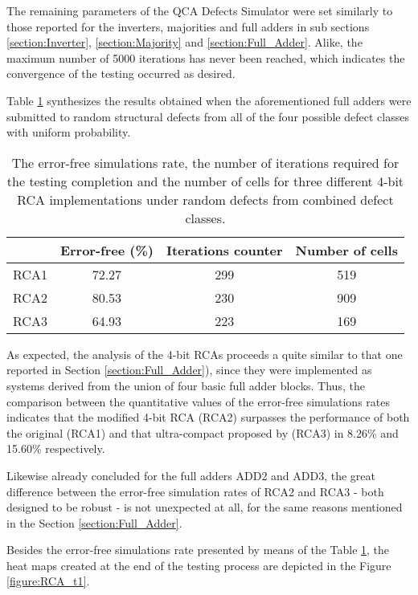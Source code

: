 The remaining parameters of the QCA Defects Simulator were set similarly to those reported for the inverters, majorities and full adders in sub sections \ref{section:Inverter}, \ref{section:Majority} and \ref{section:Full_Adder}. Alike, the maximum number of 5000 iterations has never been reached, which indicates the convergence of the testing occurred as desired.

Table \ref{table:RCA} synthesizes the results obtained when the aforementioned full adders were submitted to random structural defects from all of the four possible defect classes with uniform probability.

\begin{table}[H]
\centering
\caption{The error-free simulations rate, the number of iterations required for the testing completion and the number of cells for three different 4-bit RCA implementations under random defects from combined defect classes.}
\label{table:RCA}
\begin{tabular}{|c|c|c|c|}
\hline
 & Error-free (\%) & Iterations counter & Number of cells \\
\hline
 RCA1 & 72.27 & 299 & 519 \\
\hline
 RCA2 & 80.53 & 230 & 909 \\
\hline
 RCA3 & 64.93 & 223 & 169 \\
\hline

\end{tabular}
\end{table}

As expected, the analysis of the 4-bit RCAs proceeds a quite similar to that one reported in Section \ref{section:Full_Adder}), since they were implemented as systems derived from the union of four basic full adder blocks. Thus, the comparison between the quantitative values of the error-free simulations rates indicates that the modified 4-bit RCA (RCA2) surpasses the performance of both the original (RCA1) and that ultra-compact proposed by  (RCA3) in 8.26\% and 15.60\% respectively.

Likewise already concluded for the full adders ADD2 and ADD3, the great difference between the error-free simulation rates of RCA2 and RCA3 - both designed to be robust - is not unexpected at all, for the same reasons mentioned in the Section \ref{section:Full_Adder}.

Besides the error-free simulations rate presented by means of the Table \ref{table:RCA}, the heat maps created at the end of the testing process are depicted in the Figure \ref{figure:RCA_t1}.

